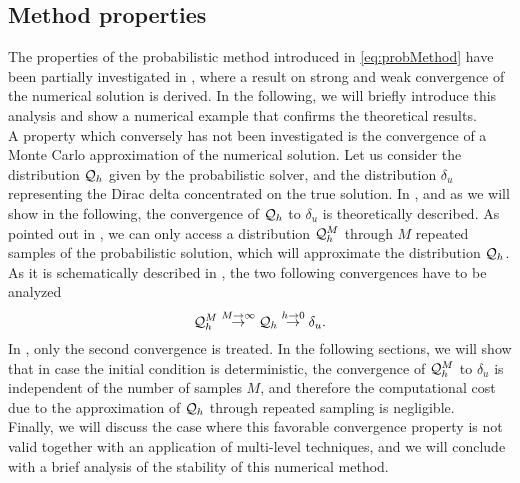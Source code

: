 \subsection{Method properties}
The properties of the probabilistic method introduced in \eqref{eq:probMethod} have been partially investigated in \cite{CGS16}, where a result on strong and weak convergence of the numerical solution is derived. In the following, we will briefly introduce this analysis and show a numerical example that confirms the theoretical results. \\
A property which conversely has not been investigated is the convergence of a Monte Carlo approximation of the numerical solution. Let us consider the distribution $\mathcal{Q}_h$ given by the probabilistic solver, and the distribution $\delta_u$ representing the Dirac delta concentrated on the true solution. In \cite{CGS16}, and as we will show in the following, the convergence of $\mathcal{Q}_h$ to $\delta_u$ is theoretically described. As pointed out in \cite{KeH16}, we can only access a distribution $\mathcal{Q}_h^M$ through $M$ repeated samples of the probabilistic solution, which will approximate the distribution $\mathcal{Q}_h$. As it is schematically described in \cite{KeH16}, the two following convergences have to be analyzed
\begin{equation}
	\mathcal{Q}_h^M \stackrel{M\to \infty}{\to} \mathcal{Q}_h \stackrel{h\to 0}{\to} \delta_u.
\end{equation}
In \cite{CGS16}, only the second convergence is treated. In the following sections, we will show that in case the initial condition is deterministic, the convergence of $\mathcal{Q}_h^M$ to $\delta_u$ is independent of the number of samples $M$, and therefore the computational cost due to the approximation of $\mathcal{Q}_h$ through repeated sampling is negligible. \\
Finally, we will discuss the case where this favorable convergence property is not valid together with an application of multi-level techniques, and we will conclude with a brief analysis of the stability of this numerical method. 










